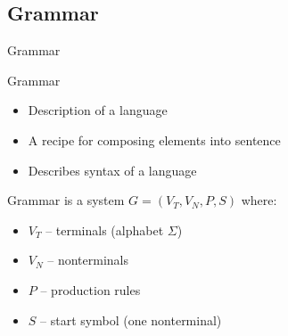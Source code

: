 \documentclass{beamer}
\begin{document}
\subsection{Grammar}

\begin{frame}{Grammar}

\begin{block}{Grammar}
\begin{itemize}
\item Description of a language
\item A recipe for composing elements into sentence
\item Describes syntax of a language
\end{itemize}
\end{block}

\begin{definition}{Grammar}
is a system $G = (V_T, V_N, P, S)$ where:
\begin{itemize}
\item $V_T$ -- terminals (alphabet $\Sigma$)
\item $V_N$ -- nonterminals
\item $P$ -- production rules
\item $S$ -- start symbol (one nonterminal)
\end{itemize}
\end{definition}

\end{frame}
\end{document}

